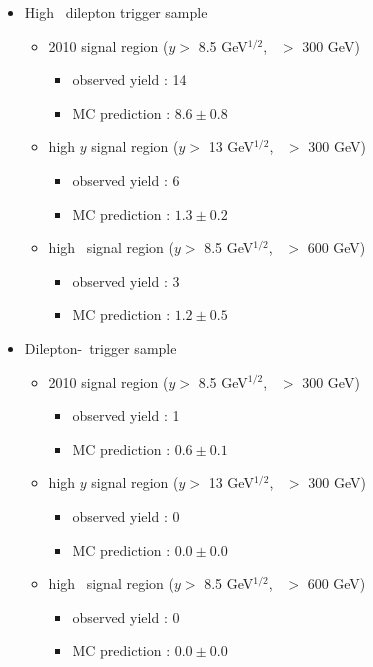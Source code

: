 \begin{itemize}
\item High \pt\ dilepton trigger sample
\begin{itemize}
\item 2010 signal region ($y >$ 8.5 GeV$^{1/2}$, \Ht\ $>$ 300 GeV)
   \begin{itemize} 
   \item observed yield : 14 
   \item MC prediction  : $8.6 \pm 0.8$
   \end{itemize}  
\item high $y$ signal region ($y >$ 13 GeV$^{1/2}$, \Ht\ $>$ 300 GeV)
   \begin{itemize} 
   \item observed yield : 6 
   \item MC prediction  : $1.3 \pm 0.2$
   \end{itemize}  
\item high \Ht\ signal region ($y >$ 8.5 GeV$^{1/2}$, \Ht\ $>$ 600 GeV)
   \begin{itemize} 
   \item observed yield : 3 
   \item MC prediction  : $1.2 \pm 0.5$
   \end{itemize}  
\end{itemize}

\item Dilepton-\Ht\ trigger sample
\begin{itemize}
\item 2010 signal region ($y >$ 8.5 GeV$^{1/2}$, \Ht\ $>$ 300 GeV)
   \begin{itemize} 
   \item observed yield : 1 
   \item MC prediction  : $0.6 \pm 0.1$
   \end{itemize}  
\item high $y$ signal region ($y >$ 13 GeV$^{1/2}$, \Ht\ $>$ 300 GeV)
   \begin{itemize} 
   \item observed yield : 0 
   \item MC prediction  : $0.0 \pm 0.0$
   \end{itemize}  
\item high \Ht\ signal region ($y >$ 8.5 GeV$^{1/2}$, \Ht\ $>$ 600 GeV)
   \begin{itemize} 
   \item observed yield : 0 
   \item MC prediction  : $0.0 \pm 0.0$
   \end{itemize}  
\end{itemize}
\end{itemize}

